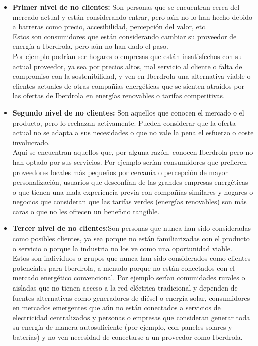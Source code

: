 \documentclass{article}
\begin{document}
\begin{itemize}
    \item \textbf{Primer nivel de no clientes:} Son personas que se encuentran cerca del mercado actual y están considerando entrar, pero aún no lo han hecho debido a barreras como precio, accesibilidad, percepción del valor, etc. 
    \\
    
    Estos son consumidores que están considerando cambiar su proveedor de energía a Iberdrola, pero aún no han dado el paso. \\
    Por ejemplo podrían ser hogares o empresas que están insatisfechos con su actual proveedor, ya sea por precios altos, mal servicio al cliente o falta de compromiso con la sostenibilidad, y ven en Iberdrola una alternativa viable o clientes actuales de otras compañías energéticas que se sienten atraídos por las ofertas de Iberdrola en energías renovables o tarifas competitivas. 
    \item \textbf{Segundo nivel de no clientes:} Son aquellos que conocen el mercado o el producto, pero lo rechazan activamente. Pueden considerar que la oferta actual no se adapta a sus necesidades o que no vale la pena el esfuerzo o coste involucrado.
    \\
    
    Aquí se encuentran aquellos que, por alguna razón, conocen Iberdrola pero no han optado por sus servicios. Por ejemplo serían consumidores que prefieren proveedores locales más pequeños por cercanía o percepción de mayor personalización, usuarios que desconfían de las grandes empresas energéticas o que tienen una mala experiencia previa con compañías similares y hogares o negocios que consideran que las tarifas verdes (energías renovables) son más caras o que no les ofrecen un beneficio tangible.
    \item \textbf{Tercer nivel de no clientes:}Son personas que nunca han sido consideradas como posibles clientes, ya sea porque no están familiarizadas con el producto o servicio o porque la industria no los ve como una oportunidad viable.
    \\
    
    Estos son individuos o grupos que nunca han sido considerados como clientes potenciales para Iberdrola, a menudo porque no están conectados con el mercado energético convencional.  Por ejemplo serían comunidades rurales o aisladas que no tienen acceso a la red eléctrica tradicional y dependen de fuentes alternativas como generadores de diésel o energía solar, consumidores en mercados emergentes que aún no están conectados a servicios de electricidad centralizados y personas o empresas que consideran generar toda su energía de manera autosuficiente (por ejemplo, con paneles solares y baterías) y no ven necesidad de conectarse a un proveedor como Iberdrola.
    \end{itemize}
\end{document}
